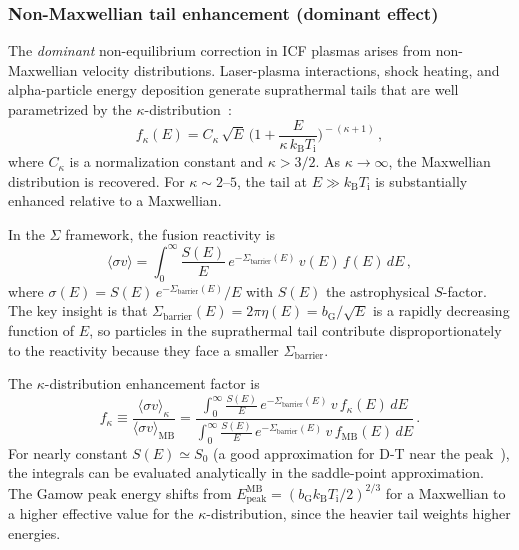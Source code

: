\documentclass[prc,twocolumn,superscriptaddress,longbibliography,floatfix]{revtex4-2}
\newcommand{\kB}{k_{\mathrm{B}}}
\newcommand{\Sbar}{\Sigma_{\mathrm{barrier}}}
\newcommand{\Ep}{E_{\mathrm{peak}}}
\newcommand{\Ti}{T_{\mathrm{i}}}
\begin{document}
\subsubsection{Non-Maxwellian tail enhancement (dominant effect)}

The \emph{dominant} non-equilibrium correction in ICF plasmas arises
from non-Maxwellian velocity distributions.  Laser-plasma interactions,
shock heating, and alpha-particle energy deposition generate
suprathermal tails that are well parametrized by the
$\kappa$-distribution~\cite{Livadiotis2009,Kato1991}:
\begin{equation}
f_{\kappa}(E) = C_{\kappa}\,\sqrt{E}\,
\biggl(1 + \frac{E}{\kappa\,\kB\Ti}\biggr)^{\!-(\kappa+1)}\,,
\label{eq:kappa}
\end{equation}
where $C_{\kappa}$ is a normalization constant and $\kappa > 3/2$.
As $\kappa \to \infty$, the Maxwellian distribution is recovered.
For $\kappa \sim 2$--$5$, the tail at $E \gg \kB\Ti$ is substantially
enhanced relative to a Maxwellian.

In the $\Sigma$ framework, the fusion reactivity is
\begin{equation}
\langle\sigma v\rangle = \int_{0}^{\infty}\!
\frac{S(E)}{E}\,e^{-\Sbar(E)}\,v(E)\,f(E)\,dE\,,
\end{equation}
where $\sigma(E) = S(E)\,e^{-\Sbar(E)}/E$ with $S(E)$ the astrophysical
$S$-factor.  The key insight is that $\Sbar(E) = 2\pi\eta(E)
= b_{\mathrm{G}}/\sqrt{E}$ is a rapidly decreasing function of $E$,
so particles in the suprathermal tail contribute disproportionately to
the reactivity because they face a smaller $\Sbar$.

The $\kappa$-distribution enhancement factor is
\begin{equation}
f_{\kappa} \equiv
\frac{\langle\sigma v\rangle_{\kappa}}
{\langle\sigma v\rangle_{\mathrm{MB}}}
= \frac{\displaystyle\int_{0}^{\infty}
\frac{S(E)}{E}\,e^{-\Sbar(E)}\,v\,f_{\kappa}(E)\,dE}
{\displaystyle\int_{0}^{\infty}
\frac{S(E)}{E}\,e^{-\Sbar(E)}\,v\,f_{\mathrm{MB}}(E)\,dE}\,.
\label{eq:kappa_ratio}
\end{equation}
For nearly constant $S(E) \simeq S_{0}$ (a good approximation for
D-T near the peak~\cite{Bosch1992}), the integrals can be evaluated
analytically in the saddle-point approximation.  The Gamow peak energy
shifts from $\Ep^{\mathrm{MB}} = (b_{\mathrm{G}}\kB\Ti/2)^{2/3}$
for a Maxwellian to a higher effective value for the
$\kappa$-distribution, since the heavier tail weights higher energies.
\end{document}
